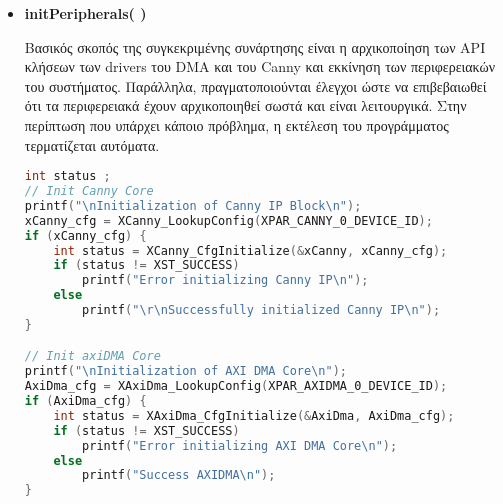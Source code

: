 \begin{itemize}[label={},leftmargin=*]
\begin{lstlisting}[language=C++,belowskip=-0.3\baselineskip]
isDone = XCanny_IsDone(&xCanny);
isIdle = XCanny_IsIdle(&xCanny);
isReady = XCanny_IsReady(&xCanny);
printf("Canny edge detector: isDone %d, isIdle %d, isReady%d\r\n", isDone, isIdle, isReady);
\end{lstlisting}

Aφότου πραγματοποιηθεί η λήψη των δεδομένων και πριν τη χρήση τους, πρέπει να πραγματοποιήσουμε το "invalidation" τους ώστε η προσπέλασή τους να είναι επιτυχής. Οι διαδικασίες αυτές πραγματοποιούνται ως εξής:
\begin{lstlisting}[language=C++,belowskip=-0.3\baselineskip]
Xil_DCacheFlushRange((int)output,ARRAY_SIZE*sizeof(int));

// Perform receive function

Xil_DCacheInvalidateRange((u32)outBuffer, ARRAY_SIZE*sizeof(int));

// Use data
\end{lstlisting}

\item \textbf{initPeripherals( )}

Βασικός σκοπός της συγκεκριμένης συνάρτησης είναι η αρχικοποίηση των API κλήσεων των drivers του DMA και του Canny και εκκίνηση των περιφερειακών του συστήματος. Παράλληλα, πραγματοποιούνται έλεγχοι ώστε να επιβεβαιωθεί ότι τα περιφερειακά έχουν αρχικοποιηθεί σωστά και είναι λειτουργικά. Στην περίπτωση που υπάρχει κάποιο πρόβλημα, η εκτέλεση του προγράμματος τερματίζεται αυτόματα.
\begin{lstlisting}[language=C++,belowskip=-0.3\baselineskip]
int status ;
// Init Canny Core
printf("\nInitialization of Canny IP Block\n");
xCanny_cfg = XCanny_LookupConfig(XPAR_CANNY_0_DEVICE_ID);
if (xCanny_cfg) {
	int status = XCanny_CfgInitialize(&xCanny, xCanny_cfg);
	if (status != XST_SUCCESS)
		printf("Error initializing Canny IP\n");
	else
		printf("\r\nSuccessfully initialized Canny IP\n");
}

// Init axiDMA Core
printf("\nInitialization of AXI DMA Core\n");
AxiDma_cfg = XAxiDma_LookupConfig(XPAR_AXIDMA_0_DEVICE_ID);
if (AxiDma_cfg) {
	int status = XAxiDma_CfgInitialize(&AxiDma, AxiDma_cfg);
	if (status != XST_SUCCESS)
		printf("Error initializing AXI DMA Core\n");
	else
		printf("Success AXIDMA\n");
}
\end{lstlisting}

\end{itemize}

